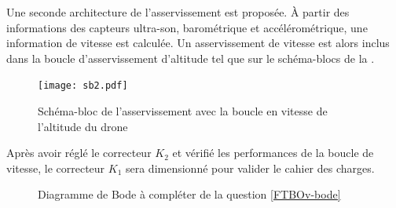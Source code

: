 \documentclass[10pt]{article}
\begin{document}
Une seconde architecture de l'asservissement est proposée. À partir des informations des capteurs ultra-son, barométrique et accélérométrique, une information de vitesse est calculée. Un asservissement de vitesse est alors inclus dans la boucle d'asservissement d'altitude tel que sur le schéma-blocs de la .

\begin{figure}[h!]
\centering
\texttt{[image: sb2.pdf]}
\caption{Schéma-bloc de l'asservissement avec la boucle en vitesse de l'altitude du drone }
\label{sb2}
\end{figure}


Après avoir réglé le correcteur \(K_{2}\) et vérifié les performances de la boucle de vitesse, le correcteur
\(K_{1}\) sera dimensionné pour valider le cahier des charges.

 \label{FTBOv-bode}

\begin{figure}[h!]
\centering
{}
\caption{Diagramme de Bode à compléter de la question \ref{FTBOv-bode}}
\end{figure}





\end{document}
